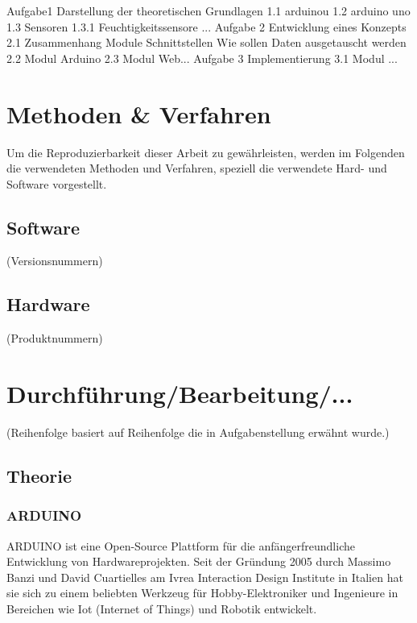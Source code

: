 \documentclass[
    load-dhbw-templates,
    load-preamble = true,
    auto-intro-pages = all,
    add-tocs-to-toc,
    debug = true,
    language = english,
    mainlanguage = ngerman,
    add-bibliography,
    bib-file = dhbw-source.bib,
    biblatex/style = alphabetic, 
]{iodhbwm}
\begin{document}
    Aufgabe1 
    Darstellung der theoretischen Grundlagen
    1.1 arduinou
    1.2 arduino uno
    1.3 Sensoren
    1.3.1 Feuchtigkeitssensore
    ...
    Aufgabe 2
    Entwicklung eines Konzepts
    2.1 Zusammenhang Module
    Schnittstellen
    Wie sollen Daten ausgetauscht werden
    2.2 Modul Arduino
    2.3 Modul Web...
    Aufgabe 3
    Implementierung
    3.1 Modul ... 
    





\chapter{Methoden \& Verfahren}
    Um die Reproduzierbarkeit dieser Arbeit zu gewährleisten, werden im Folgenden die verwendeten Methoden und Verfahren, speziell die verwendete Hard- und Software vorgestellt.
    
    \section{Software}
        (Versionsnummern)
    \section{Hardware}
        (Produktnummern)
    


\chapter{Durchführung/Bearbeitung/...}

(Reihenfolge basiert auf Reihenfolge die in Aufgabenstellung erwähnt wurde.)

    \section{Theorie}
        \subsection{ARDUINO}
        ARDUINO ist eine Open-Source Plattform für die anfängerfreundliche Entwicklung von Hardwareprojekten.
        Seit der Gründung 2005 durch Massimo Banzi und David Cuartielles am Ivrea Interaction Design Institute in Italien hat sie sich zu einem beliebten Werkzeug für Hobby-Elektroniker und Ingenieure in Bereichen wie Iot (Internet of Things) und Robotik entwickelt.  %
       
\end{document}
